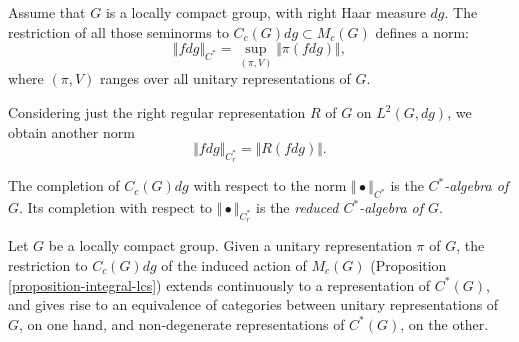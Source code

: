 Assume that $G$ is a locally compact group, with right Haar measure $dg$. The restriction of all those seminorms to $C_c(G)dg\subset M_c(G)$ defines a norm:
$$ \Vert fdg \Vert_{C^*} = \sup_{(\pi,V)} \Vert \pi(fdg)\Vert,$$
where $(\pi,V)$ ranges over all unitary representations of $G$. 

Considering just the right regular representation $R$ of $G$ on $L^2(G,dg)$, we obtain another norm
$$ \Vert fdg \Vert_{C_r^*} = \Vert R(fdg)\Vert.$$

\begin{definition}
\label{definition-Cstar}
The completion of $C_c(G) dg$ with respect to the norm $\Vert\bullet\Vert_{C^*}$ is the {\it $C^*$-algebra of $G$}. Its completion with respect to $\Vert\bullet \Vert_{C_r^*}$ is the {\it reduced $C^*$-algebra of $G$}.
\end{definition}



\begin{proposition}
\label{proposition-equivalence-unitary-Cstar}
Let $G$ be a locally compact group. Given a unitary representation $\pi$ of $G$, the restriction to $C_c(G) dg$ of the induced action of $M_c(G)$ (Proposition \ref{proposition-integral-lcs}) extends continuously to a representation of $C^*(G)$, and gives rise to an equivalence of categories between unitary representations of $G$, on one hand, and non-degenerate representations of $C^*(G)$, on the other. 
\end{proposition}

